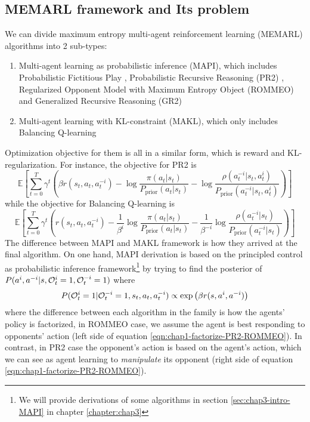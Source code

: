 \subsection{MEMARL framework and Its problem}
\label{sec:chap1-MEMARL-And-Problem}
We can divide maximum entropy multi-agent reinforcement learning (MEMARL) algorithms into 2 sub-types: 
\begin{enumerate}
    \item Multi-agent learning as probabilistic inference (MAPI), which includes Probabilistic Fictitious Play \cite{rezek2005unifying}, Probabilistic Recursive Reasoning (PR2) \cite{wen2019probabilistic} , Regularized Opponent Model with Maximum Entropy Object (ROMMEO) \cite{tian2019regularized} and Generalized Recursive Reasoning (GR2) \cite{wen2019multi}
    \item Multi-agent learning with KL-constraint (MAKL), which only includes Balancing Q-learning \cite{grau2018balancing}
\end{enumerate}
Optimization objective for them is all in a similar form, which is reward and KL-regularization. For instance, the objective for PR2 is 
\begin{equation}
    \mathbb{E}\left[ \sum^T_{t=0} \gamma^t \left(\beta r(s_t, a_t, a^{-i}_t) - \log\frac{\pi(a_t|s_t)}{P_{\operatorname{prior}}(a_t|s_t)} -\log \frac{\rho(a^{-i}_t|s_t, a^i_t)}{P_{\operatorname{prior}}(a^{-i}_t|s_t, a^i_t)} \right) \right]
\end{equation}
while the objective for Balancing Q-learning is 
\begin{equation}
    \mathbb{E}\left[ \sum^T_{t=0} \gamma^t \left(r(s_t, a_t, a^{-i}_t) - \frac{1}{\beta^i} \log\frac{\pi(a_t|s_t)}{P_{\operatorname{prior}}(a_t|s_t)} - \frac{1}{\beta^{-i}}\log \frac{\rho(a^{-i}_t|s_t)}{P_{\operatorname{prior}}(a^{-i}_t|s_t)} \right) \right]
\end{equation}
The difference between MAPI and MAKL framework is how they arrived at the final algorithm. On one hand, MAPI derivation is based on the principled control as probabilistic inference framework\footnote{We will provide derivations of some algorithms in section \ref{sec:chap3-intro-MAPI} in chapter \ref{chapter:chap3}} by trying to find the posterior of $P(a^i, a^{-i} | s, \mathcal{O}^i_t = 1, \mathcal{O}^{-i}_t = 1)$ where
\begin{equation}
    P(\mathcal{O}^i_t = 1 | \mathcal{O}^{-i}_t = 1, s_t, a_t, a^{-i}_t) \propto \exp\left( \beta r(s, a^i, a^{-i}) \right)
\end{equation}
where the difference between each algorithm in the family is how the agents' policy is factorized, in ROMMEO case, we assume the agent is best responding to opponents' action (left side of equation \ref{eqn:chap1-factorize-PR2-ROMMEO}). In contrast, in PR2 case the opponent's action is based on the agent's action, which we can see as agent learning to \textit{manipulate} its opponent (right side of equation \ref{eqn:chap1-factorize-PR2-ROMMEO}).
